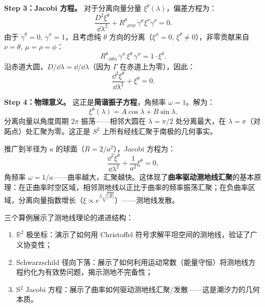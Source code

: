 \textbf{Step 3：Jacobi 方程。} 对于分离向量分量 $\xi^\theta(\lambda)$，偏差方程为：
\begin{equation}
    \frac{D^2 \xi^\theta}{\dd\lambda^2} + R^\theta{}_{\mu\nu\rho} \, \dot\gamma^\mu \xi^\nu \dot\gamma^\rho = 0.
\end{equation}
由于 $\dot\gamma^\theta = 0$, $\dot\gamma^\phi = 1$，且考虑纯 $\theta$ 方向的分离（$\xi^\phi = 0$, $\xi^\theta \neq 0$），非零贡献来自 $\nu = \theta$, $\mu = \rho = \phi$：
\begin{equation}
    R^\theta{}_{\phi\theta\phi} \, \dot\gamma^\phi \, \xi^\theta \, \dot\gamma^\phi = 1 \cdot \xi^\theta.
\end{equation}
沿赤道大圆，$D/\dd\lambda = \dd/\dd\lambda$（因为 $\Gamma$ 在赤道上为零），因此：
\begin{equation}
    \boxed{\frac{\dd^2 \xi^\theta}{\dd\lambda^2} + \xi^\theta = 0}.
\end{equation}

\textbf{Step 4：物理意义。} 这正是\textbf{简谐振子方程}，角频率 $\omega = 1$。解为：
\begin{equation}
    \xi^\theta(\lambda) = A \cos\lambda + B \sin\lambda.
\end{equation}
分离向量以角度周期 $2\pi$ 振荡——相邻大圆在 $\lambda = \pi/2$ 处分离最大，在 $\lambda = \pi$（对跖点）处汇聚为零。这正是 $S^2$ 上所有经线汇聚于南极的几何事实。

推广到半径为 $a$ 的球面（$R = 2/a^2$），Jacobi 方程为：
\begin{equation}
    \frac{\dd^2 \xi^\theta}{\dd\lambda^2} + \frac{1}{a^2} \xi^\theta = 0,
\end{equation}
角频率 $\omega = 1/a$——曲率越大，汇聚越快。这体现了\textbf{曲率驱动测地线汇聚}的基本原理：在正曲率时空区域，相邻测地线以正比于曲率的频率振荡汇聚；在负曲率区域，分离向量指数增长（$\xi \propto e^{\lambda\sqrt{|\mathcal{R}|}}$）——测地线发散。

\begin{note}[算例总结]
三个算例展示了测地线理论的递进结构：
\begin{enumerate}
    \item $\mathbb{R}^2$ 极坐标：演示了如何用 Christoffel 符号求解平坦空间的测地线，验证了广义协变性；
    \item Schwarzschild 径向下落：展示了如何利用运动常数（能量守恒）将测地线方程约化为有效势问题，揭示测地不完备性；
    \item S$^2$ Jacobi 方程：展示了曲率如何驱动测地线汇聚/发散——这是潮汐力的几何本质。
\end{enumerate}
\end{note}
